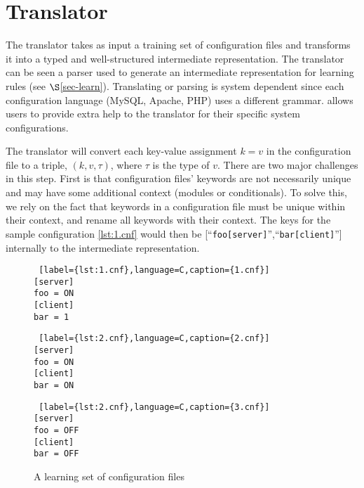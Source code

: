 
\section{Translator}
\label{sec-trans}

The translator takes as input a training set of configuration files and transforms it into a typed and well-structured intermediate representation.
The translator can be seen a parser used to generate an intermediate representation for learning rules (see $\S$\ref{sec-learn}).
Translating or parsing is system dependent since each configuration language (MySQL, Apache, PHP) uses a different grammar.
\app allows users to provide extra help to the translator for their specific system configurations.

The translator will convert each key-value assignment $k=v$ in the configuration file to a triple, $(k, v, \tau)$, where $\tau$ is the type of $v$. 
There are two major challenges in this step.
First is that configuration files' keywords are not necessarily unique and may have some additional context (modules or conditionals).
To solve this, we rely on the fact that keywords in a configuration file must be unique within their context, and rename all keywords with their context.
The keys for the sample configuration \ref{lst:1.cnf} would then be [``{\tt foo[server]}'',``{\tt bar[client]}''] internally to the intermediate representation.


\begin{figure}[!htb]
    \centering
    \begin{minipage}{.25\textwidth}
	\begin{lstlisting} [label={lst:1.cnf},language=C,caption={1.cnf}]
[server]
foo = ON
[client]
bar = 1
	\end{lstlisting}
    \end{minipage}%
    \hspace{1cm}
    \begin{minipage}{0.25\textwidth}
	\begin{lstlisting} [label={lst:2.cnf},language=C,caption={2.cnf}]
[server]
foo = ON
[client]
bar = ON
	\end{lstlisting}
    \end{minipage}
    \hspace{1cm}
    \begin{minipage}{0.25\textwidth}
	\begin{lstlisting} [label={lst:2.cnf},language=C,caption={3.cnf}]
[server]
foo = OFF
[client]
bar = OFF
	\end{lstlisting}
    \end{minipage}
    \caption{A learning set of configuration files}
    \label{fig:tset}
\end{figure}



